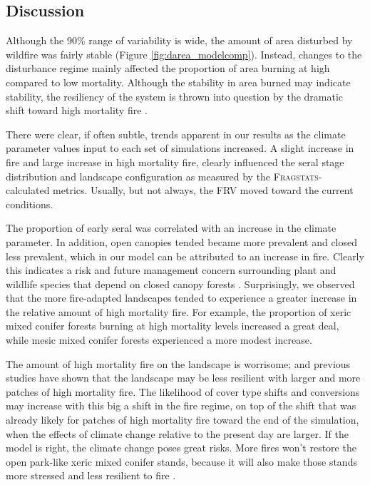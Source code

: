 \documentclass[12pt]{article}
\begin{document}
\begin{spacing}{1}
\section{Discussion}

Although the 90\% range of variability is wide, the amount of area disturbed by wildfire was fairly stable (Figure \ref{fig:darea_modelcomp}). Instead, changes to the disturbance regime mainly affected the proportion of area burning at high compared to low mortality. Although the stability in area burned may indicate stability, the resiliency of the system is thrown into question by the dramatic shift toward high mortality fire \citep{Stephens2013,Lydersen2014,Miller2012}.

There were clear, if often subtle, trends apparent in our results as the climate parameter values input to each set of simulations increased. A slight increase in fire and large increase in high mortality fire, clearly influenced the seral stage distribution and landscape configuration as measured by the \textsc{Fragstats}-calculated metrics. Usually, but not always, the FRV moved toward the current conditions.

The proportion of early seral was correlated with an increase in the climate parameter. In addition, open canopies tended became more prevalent and closed less prevalent, which in our model can be attributed to an increase in fire. Clearly this indicates a risk and future management concern surrounding plant and wildlife species that depend on closed canopy forests \citep{McKenzie2004}. Surprisingly, we observed that the more fire-adapted landscapes tended to experience a greater increase in the relative amount of high mortality fire. For example, the proportion of xeric mixed conifer forests burning at high mortality levels increased a great deal, while mesic mixed conifer forests experienced a more modest increase.

The amount of high mortality fire on the landscape is worrisome; and previous studies have shown that the landscape may be less resilient with larger and more patches of high mortality fire. The likelihood of cover type shifts and conversions may increase with this big a shift in the fire regime, on top of the shift that was already likely for patches of high mortality fire toward the end of the simulation, when the effects of climate change relative to the present day are larger. If the model is right, the climate change poses great risks. More fires won't restore the open park-like xeric mixed conifer stands, because it will also make those stands more stressed and less resilient to fire \citep{Lydersen2014}.


\end{spacing}
\end{document}
